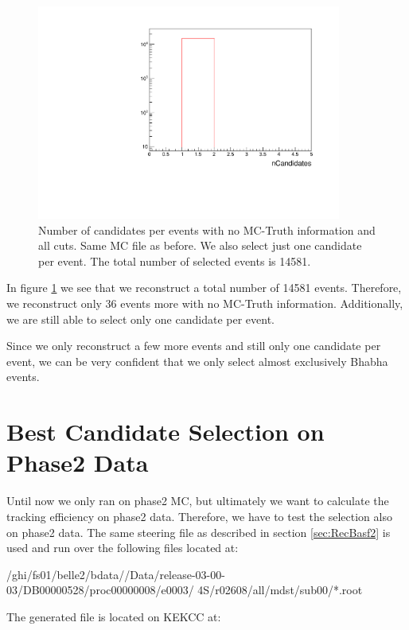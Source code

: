 \documentclass[a4paper,11pt,twosided,final,german,openbib,pdftex,listof=totoc,bibliography=totoc]{scrbook}
\begin{document}
\begin{figure}[h!]
	\centering
	\includegraphics[width=10cm]{Cuts/nCandNoMCInfo.pdf}
	\caption[Number Of Candidates Per Event With No MC-Truth Info (All Cuts)]{Number of candidates per events with no MC-Truth information and all cuts. Same MC file as before. We also select just one candidate per event. The total number of selected events is 14581.}
	\label{fig:nCandNoMCInfo}
\end{figure}

In figure \ref{fig:nCandNoMCInfo} we see that we reconstruct a total number of 14581 events. Therefore, we reconstruct only 36 events more with no MC-Truth information. Additionally, we are still able to select only one candidate per event. 

Since we only reconstruct a few more events and still only one candidate per event, we can be very confident that we only select almost exclusively Bhabha events.

\section{Best Candidate Selection on Phase2 Data}
\label{sec:SelectingBhabhaData}

Until now we only ran on phase2 MC, but ultimately we want to calculate the tracking efficiency on phase2 data. Therefore, we have to test the selection also on phase2 data. The same steering file as described in section \ref{sec:RecBasf2} is used and run over the following files located at:
\newline

/ghi/fs01/belle2/bdata//Data/release-03-00-03/DB00000528/proc00000008/e0003/
4S/r02608/all/mdst/sub00/*.root
\newline

The generated file is located on KEKCC at:
\newline
\end{document}
